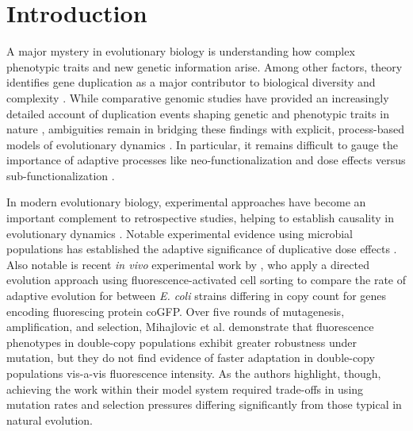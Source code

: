\section{Introduction} \label{sec:introduction}

A major mystery in evolutionary biology is understanding how complex phenotypic traits and new genetic information arise.
Among other factors, theory identifies gene duplication as a major contributor to biological diversity and complexity \citep{Zhang2003,Otto2000,Wagner2008,Crow:2006role,Magadum:2013wu,Metz:chromosomeDuplication1947,Hu:2010ea,Castellanos2024,Lynch2000b,Lynch2003}.
While comparative genomic studies have provided an increasingly detailed account of duplication events shaping genetic and phenotypic traits in nature \citep{Zhang2014,teichmann_structural_1998,Teichmann:2004cz,DuBose2024,Voordeckers2012,Pougach2014,Moore2003}, ambiguities remain in bridging these findings with explicit, process-based models of evolutionary dynamics \citep{Welch2016}.
In particular, it remains difficult to gauge the importance of adaptive processes like neo-functionalization and dose effects versus sub-functionalization \citep{Innan2010,Zhang:2003fw,Kuzmin2022}.

In modern evolutionary biology, experimental approaches have become an important complement to retrospective studies, helping to establish causality in evolutionary dynamics \citep{Kawecki2012,Elena2003}.
Notable experimental evidence using microbial populations has established the adaptive significance of duplicative dose effects \citep{Tong2025,Dhar2014,Nsvall2012}.
Also notable is recent \textit{in vivo} experimental work by \citet{mihajlovic2025direct}, who apply a directed evolution approach using fluorescence-activated cell sorting to compare the rate of adaptive evolution for between \textit{E. coli} strains differing in copy count for genes encoding fluorescing protein coGFP.
Over five rounds of mutagenesis, amplification, and selection, Mihajlovic et al. demonstrate that fluorescence phenotypes in double-copy populations exhibit greater robustness under mutation, but they do not find evidence of faster adaptation in double-copy populations vis-a-vis fluorescence intensity.
As the authors highlight, though, achieving the work within their model system required trade-offs in using mutation rates and selection pressures differing significantly from those typical in natural evolution.

